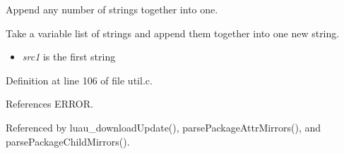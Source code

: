 Append any number of strings together into one. 

Take a variable list of strings and append them together into one new string.

\begin{itemize}
\item {\em src1\/} is the first string 
\end{itemize}


Definition at line 106 of file util.c.

References ERROR.

Referenced by luau\_\-download\-Update(), parse\-Package\-Attr\-Mirrors(), and parse\-Package\-Child\-Mirrors().